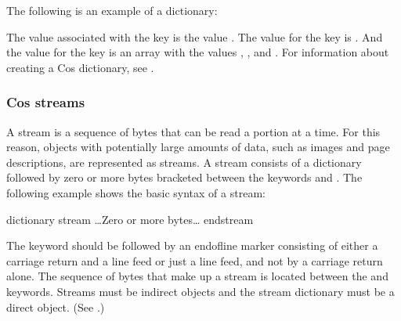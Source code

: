 \documentclass[letterpaper,12pt,english,openany,oneside]{sphinxmanual}
\begin{document}
The following is an example of a dictionary:

\begin{sphinxVerbatim}[commandchars=\\\{\}]
      \PYG{p}{[}  \PYG{p}{]}
\end{sphinxVerbatim}

The value associated with the  key is the value . The value for the  key is . And the value for the  key is an array with the values , , and . For information about creating a Cos dictionary, see .


\subsubsection{Cos streams}
\label{\detokenize{Plugins_Cos:cos-streams}}
A stream is a sequence of bytes that can be read a portion at a time. For this reason, objects with potentially large amounts of data, such as images and page descriptions, are represented as streams. A stream consists of a dictionary followed by zero or more bytes bracketed between the keywords  and . The following example shows the basic syntax of a stream:

\begin{sphinxVerbatim}[commandchars=\\\{\}]
dictionary
stream
    …Zero or more bytes…
endstream
\end{sphinxVerbatim}

The  keyword should be followed by an end\sphinxhyphen{}of\sphinxhyphen{}line marker consisting of either a carriage return and a line feed or just a line feed, and not by a carriage return alone. The sequence of bytes that make up a stream is located between the  and  keywords. Streams must be indirect objects and the stream dictionary must be a direct object. (See .)
\end{document}
